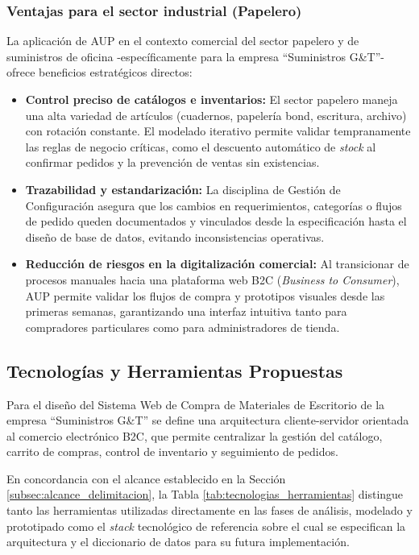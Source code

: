 \subsubsection{Ventajas para el sector industrial (Papelero)}

La aplicación de AUP en el contexto comercial del sector papelero y de suministros de oficina -específicamente para la empresa ``Suministros G\&T''- ofrece beneficios estratégicos directos:

\begin{itemize}
    \item \textbf{Control preciso de catálogos e inventarios:} El sector papelero maneja una alta variedad de artículos (cuadernos, papelería bond, escritura, archivo) con rotación constante. El modelado iterativo permite validar tempranamente las reglas de negocio críticas, como el descuento automático de \textit{stock} al confirmar pedidos y la prevención de ventas sin existencias.
    \item \textbf{Trazabilidad y estandarización:} La disciplina de Gestión de Configuración asegura que los cambios en requerimientos, categorías o flujos de pedido queden documentados y vinculados desde la especificación hasta el diseño de base de datos, evitando inconsistencias operativas.
    \item \textbf{Reducción de riesgos en la digitalización comercial:} Al transicionar de procesos manuales hacia una plataforma web B2C (\textit{Business to Consumer}), AUP permite validar los flujos de compra y prototipos visuales desde las primeras semanas, garantizando una interfaz intuitiva tanto para compradores particulares como para administradores de tienda.
\end{itemize}

\subsection{Tecnologías y Herramientas Propuestas}

Para el diseño del Sistema Web de Compra de Materiales de Escritorio de la empresa ``Suministros G\&T'' se define una arquitectura cliente-servidor orientada al comercio electrónico B2C, que permite centralizar la gestión del catálogo, carrito de compras, control de inventario y seguimiento de pedidos.

En concordancia con el alcance establecido en la Sección \ref{subsec:alcance_delimitacion}, la Tabla \ref{tab:tecnologias_herramientas} distingue tanto las herramientas utilizadas directamente en las fases de análisis, modelado y prototipado como el \textit{stack} tecnológico de referencia sobre el cual se especifican la arquitectura y el diccionario de datos para su futura implementación.

